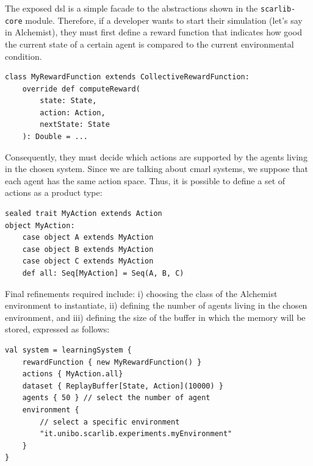 The exposed \ac{dsl} is a simple facade 
 to the abstractions shown in the \texttt{scarlib-core} module. 
Therefore, if a developer wants to start their simulation 
 (let's say in Alchemist), 
 they must first define a reward function that indicates 
 how good the current state of a certain agent 
 is compared to the current environmental condition.
\begin{lstlisting}
class MyRewardFunction extends CollectiveRewardFunction:
    override def computeReward(
        state: State, 
        action: Action, 
        nextState: State
    ): Double = ...
\end{lstlisting}
Consequently, they must decide which actions are supported 
 by the agents living in the chosen system. 
%
Since we are talking about \ac{cmarl} systems, 
 we suppose that each agent has the same action space. 
 Thus, it is possible to define a set of actions as a product type:
\begin{lstlisting}
sealed trait MyAction extends Action
object MyAction:
    case object A extends MyAction
    case object B extends MyAction
    case object C extends MyAction
    def all: Seq[MyAction] = Seq(A, B, C)
\end{lstlisting}
Final refinements required include: 
i) choosing the class of the Alchemist environment to instantiate, 
ii) defining the number of agents living in the chosen environment, and 
iii) defining the size of the buffer in which the memory will be stored,
expressed as follows:
\begin{lstlisting}
val system = learningSystem {
    rewardFunction { new MyRewardFunction() }
    actions { MyAction.all}
    dataset { ReplayBuffer[State, Action](10000) }
    agents { 50 } // select the number of agent
    environment {
        // select a specific environment
        "it.unibo.scarlib.experiments.myEnvironment"
    }
}
\end{lstlisting}

